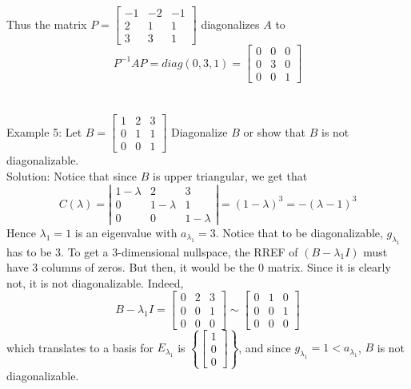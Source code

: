 \documentclass[10pt,letter]{article}
\begin{document}
Thus the matrix $P=\begin{bmatrix}-1&-2&-1\\2&1&1\\3&3&1\end{bmatrix}$ diagonalizes $A$ to $$P^{-1}AP=diag(0,3,1)=\begin{bmatrix}0&0&0\\0&3&0\\0&0&1\end{bmatrix}$$ \\ \\ 
Example 5: Let $B=\begin{bmatrix}1&2&3\\0&1&1\\0&0&1\end{bmatrix}$ Diagonalize $B$ or show that $B$ is not diagonalizable. \\ 
Solution: Notice that since $B$ is upper triangular, we get that $$C(\lambda)=\left|\begin{matrix}1-\lambda&2&3\\0&1-\lambda&1\\0&0&1-\lambda\end{matrix}\right|=(1-\lambda)^3=-(\lambda-1)^3$$ Hence $\lambda_1=1$ is an eigenvalue with $a_{\lambda_1}=3$. Notice that to be diagonalizable, $g_{\lambda_1}$ has to be 3. To get a 3-dimensional nullspace, the RREF of $(B-\lambda_1I)$ must have 3 columns of zeros. But then, it would be the 0 matrix. Since it is clearly not, it is not diagonalizable. Indeed, $$B-\lambda_1I=\begin{bmatrix}0&2&3\\0&0&1\\0&0&0\end{bmatrix}\sim\begin{bmatrix}0&1&0\\0&0&1\\0&0&0\end{bmatrix}$$ which translates to a basis for $E_{\lambda_1}$ is $\left\{\begin{bmatrix}1\\0\\0\end{bmatrix}\right\}$, and since $g_{\lambda_1}=1<a_{\lambda_1}$, $B$ is not diagonalizable. 
\end{document}
